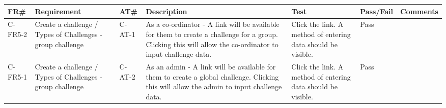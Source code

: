 \begin{longtable}{ |l|p{3cm}|l|p{5cm}|p{5cm}|l|p{6.5cm}|}
\hline
\textbf{FR\#}	&	\textbf{Requirement} & \textbf{AT\#}	&	\textbf{Description} & \textbf{Test} & \textbf{Pass/Fail} &	\textbf{Comments} \\
\hline
\endhead


C-FR5-2       & Create a challenge / Types of Challenges - group challenge  & C-AT-1  & As a co-ordinator -  A link will be available for them to create a challenge for a group. Clicking this will allow the co-ordinator to input challenge data.                                                                                                                                                                                                                                                                                                                        & Click the link. A method of entering data should be visible.                                                                                                                                                             & Pass &                                                                                                                                                                                                                                                                  \\ \hline
C-FR5-1        & Create a challenge / Types of Challenges - group challenge  & C-AT-2  & As an admin -  A link will be available for them to create a global challenge. Clicking this will allow the admin to input challenge data.                                                                                                                                                                                                                                                                                                                                          & Click the link. A method of entering data should be visible.                                                                                                                                                             & Pass &                                                                                                                                                                                                                                                                  \\ \hline

\end{longtable}
